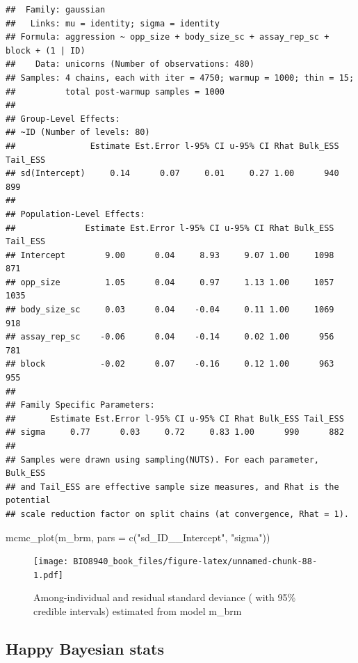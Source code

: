 \documentclass[
  12pt,
]{book}
\newenvironment{Shaded}{\begin{snugshade}}{\end{snugshade}}
\newcommand{\AttributeTok}[1]{\textcolor[rgb]{0.77,0.63,0.00}{#1}}
\newcommand{\FunctionTok}[1]{\textcolor[rgb]{0.00,0.00,0.00}{#1}}
\newcommand{\NormalTok}[1]{#1}
\newcommand{\StringTok}[1]{\textcolor[rgb]{0.31,0.60,0.02}{#1}}
\begin{document}
\begin{verbatim}
##  Family: gaussian 
##   Links: mu = identity; sigma = identity 
## Formula: aggression ~ opp_size + body_size_sc + assay_rep_sc + block + (1 | ID) 
##    Data: unicorns (Number of observations: 480) 
## Samples: 4 chains, each with iter = 4750; warmup = 1000; thin = 15;
##          total post-warmup samples = 1000
## 
## Group-Level Effects: 
## ~ID (Number of levels: 80) 
##               Estimate Est.Error l-95% CI u-95% CI Rhat Bulk_ESS Tail_ESS
## sd(Intercept)     0.14      0.07     0.01     0.27 1.00      940      899
## 
## Population-Level Effects: 
##              Estimate Est.Error l-95% CI u-95% CI Rhat Bulk_ESS Tail_ESS
## Intercept        9.00      0.04     8.93     9.07 1.00     1098      871
## opp_size         1.05      0.04     0.97     1.13 1.00     1057     1035
## body_size_sc     0.03      0.04    -0.04     0.11 1.00     1069      918
## assay_rep_sc    -0.06      0.04    -0.14     0.02 1.00      956      781
## block           -0.02      0.07    -0.16     0.12 1.00      963      955
## 
## Family Specific Parameters: 
##       Estimate Est.Error l-95% CI u-95% CI Rhat Bulk_ESS Tail_ESS
## sigma     0.77      0.03     0.72     0.83 1.00      990      882
## 
## Samples were drawn using sampling(NUTS). For each parameter, Bulk_ESS
## and Tail_ESS are effective sample size measures, and Rhat is the potential
## scale reduction factor on split chains (at convergence, Rhat = 1).
\end{verbatim}

\begin{Shaded}
\begin{Highlighting}[]
\FunctionTok{mcmc\_plot}\NormalTok{(m\_brm, }\AttributeTok{pars =} \FunctionTok{c}\NormalTok{(}\StringTok{"sd\_ID\_\_Intercept"}\NormalTok{, }\StringTok{"sigma"}\NormalTok{))}
\end{Highlighting}
\end{Shaded}

\begin{figure}
\centering
\texttt{[image: BIO8940\_book\_files/figure-latex/unnamed-chunk-88-1.pdf]}
\caption{\label{fig:unnamed-chunk-88}Among-individual and residual standard deviance ( with 95\% credible intervals) estimated from model m\_brm}
\end{figure}

\hypertarget{happy-bayesian-stats}{%
\subsection{Happy Bayesian stats}\label{happy-bayesian-stats}}
\end{document}
